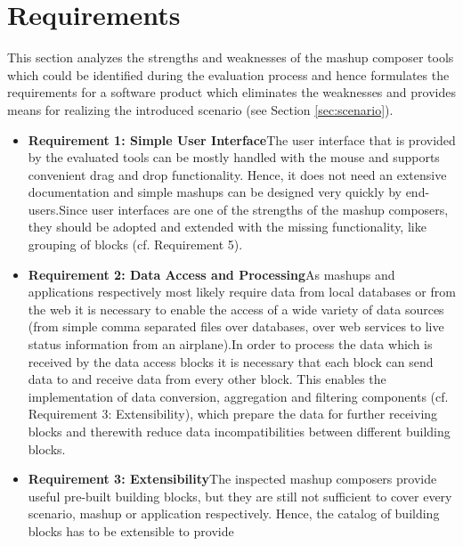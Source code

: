 \chapter{Requirements}
\label{chapter:requirements}

This section analyzes the strengths and weaknesses of the mashup composer tools which could be
identified during the evaluation process and hence formulates the requirements for a software
product which eliminates the weaknesses and provides means for realizing the introduced scenario
(see Section \ref{sec:scenario}).

\begin{itemize}
  \item \textbf{Requirement 1: Simple User Interface}\newline The user interface that is provided by
  the evaluated tools can be mostly handled with the mouse and supports convenient drag and drop
  functionality. Hence, it does not need an extensive documentation and simple mashups can be designed
  very quickly by end-users.\newline Since user interfaces are one of the strengths of the mashup
  composers, they should be adopted and extended with the missing functionality, like grouping of
  blocks (cf. Requirement 5).
  \item \textbf{Requirement 2: Data Access and Processing}\newline As mashups and applications
  respectively most likely require data from local databases or from the web it is necessary to
  enable the access of a wide variety of data sources (from simple comma separated files
  over databases, over web services to live status information from an airplane).\newline In order
  to process the data which is received by the data access blocks it is necessary that each block can
  send data to and receive data from every other block. This enables the implementation of data
  conversion, aggregation and filtering components (cf. Requirement 3: Extensibility), which prepare
  the data for further receiving blocks and therewith reduce data incompatibilities between
  different building blocks.
  \item \textbf{Requirement 3: Extensibility}\newline The inspected mashup composers provide useful
  pre-built building blocks, but they are still not sufficient to cover every scenario, mashup or
  application respectively. Hence, the catalog of building blocks has to be extensible to provide

\end{itemize}
